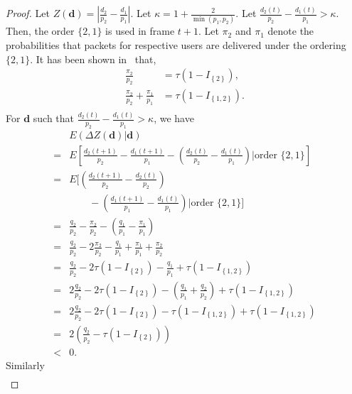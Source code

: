 \documentclass[letterpaper, 10 pt, conference]{ieeeconf}
\begin{document}
\begin{proof} Let $Z(\bm{d})  =| \frac{d_{2} }{p_{2}}- \frac{ d_{1} }{p_{1}}| $. Let $\kappa = 1+ \frac{2}{\min(p_{1},p_{2})}$. Let $\frac{d_{2}(t) }{p_{2}}- \frac{ d_{1}(t) }{p_{1}} > \kappa$. Then, the order $\{2,1\}$ is used in frame $t+1$. Let $\pi_{2}$ and $\pi_{1}$ denote the probabilities that packets for respective users are delivered under the ordering $\{2,1\}$. It has been shown in~\cite{c3} that, 
\begin{align*}
\frac{\pi_{2}}{p_{2}} &= \tau(1-I_{\left\{2\right\}}),\\
\frac{\pi_{2}}{p_{2}} + \frac{\pi_{1}}{p_{1}}& = \tau(1-I_{\left\{1,2\right\}}).\\
\end{align*} 
For $\bm{d}$ such that $\frac{d_{2}(t)}{p_{2}} - \frac{d_{1}(t)}{p_{1}}>\kappa$, we have
\begin{align*}
&E\left( \Delta Z\left(\bm{d}\right) | \bm{d}  \right) \\
=& E\left[ \frac{d_{2}(t+1) }{p_{2}}- \frac{d_{1}(t+1)}{p_{1}} -\left(\frac{d_{2}(t) }{p_{2}}- \frac{d_{1}(t)}{p_{1}} \right)\Bigg| \mbox{order }\{2,1\}  \right]\\
=&  E\Big[ \left(\frac{d_{2}(t+1) }{p_{2}}-\frac{d_{2}(t) }{p_{2}}\right) \\
&\qquad- \left(\frac{d_{1}(t+1)}{p_{1}}- \frac{d_{1}(t)}{p_{1}} \right)\Big|\mbox{order } \{2,1\}  \Big]\\
=& \frac{q_{2}}{p_{2}} - \frac{\pi_{2}}{p_{2}} -\left(\frac{q_{1}}{p_{1}} - \frac{\pi_{1}}{p_{1}} \right)\\
=& \frac{q_{2}}{p_{2}} -2\frac{\pi_{2}}{p_{2}}-\frac{q_{1}}{p_{1}}+\frac{\pi_{1}}{p_{1}}+\frac{\pi_{2}}{p_{2}}\\
=&\frac{q_{2}}{p_{2}}-2\tau\left( 1-I_{\left\{2\right\}}\right)-\frac{q_{1}}{p_{1}} + \tau\left(1-I_{\left\{1,2\right\}}\right)\\
=&2\frac{q_{2}}{p_{2}}-2\tau\left( 1-I_{\left\{2\right\}}\right)-\left(\frac{q_{1}}{p_{1}}+\frac{q_{2}}{p_{2}}\right) + \tau\left(1-I_{\left\{1,2\right\}}\right)\\
=& 2\frac{q_{2}}{p_{2}}-2\tau\left( 1-I_{\left\{2\right\}}\right)-\tau\left(1-I_{\left\{1,2\right\}}\right) + \tau\left(1-I_{\left\{1,2\right\}}\right)\\
=&2\left( \frac{q_{2}}{p_{2}} - \tau\left(1-I_{\left\{2\right\}}\right)   \right)\\
<&0.
\end{align*}
Similarly 
\begin{align*}

\end{align*}
\end{proof}
\end{document}
